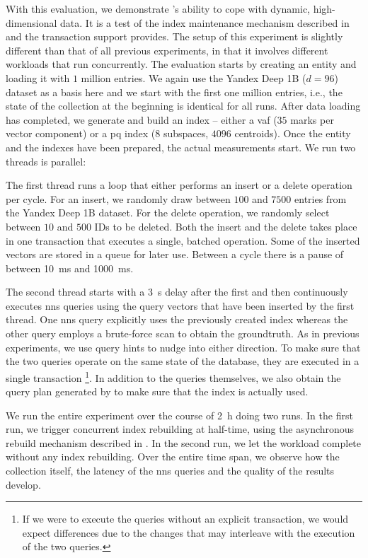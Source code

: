 With this evaluation, we demonstrate \cottontail{}'s ability to cope with dynamic, high-dimensional data. It is a test of the index maintenance mechanism described in  and the transaction support \cottontail{} provides. The setup of this experiment is slightly different than that of all previous experiments, in that it involves different workloads that run concurrently. The evaluation starts by creating an entity and loading it with $1$ million entries. We again use the Yandex Deep 1B ($d = 96$) dataset as a basis here and we start with the first one million entries, i.e., the state of the collection at the beginning is identical for all runs. After data loading has completed, we generate and build an index -- either a \acrshort{vaf} ($35$ marks per vector component) or a \acrshort{pq} index ($8$ subspaces, $4096$ centroids). Once the entity and the indexes have been prepared, the actual measurements start. We run two threads is parallel: 

The first thread runs a loop that either performs an insert or a delete operation per cycle. For an insert, we randomly draw between $100$ and $7500$ entries from the Yandex Deep 1B dataset. For the delete operation, we randomly select between $10$ and $500$ IDs to be deleted. Both the insert and the delete takes place in one transaction that executes a single, batched operation. Some of the inserted vectors are stored in a queue for later use. Between a cycle there is a pause of between \SI{10}{\milli\second} and \SI{1000}{\milli\second}.

The second thread starts with a \SI{3}{\second} delay after the first and then continuously executes \acrshort{nns} queries using the query vectors that have been inserted by the first thread. One \acrshort{nns} query explicitly uses the previously created index whereas the other query employs a brute-force scan to obtain the groundtruth. As in previous experiments, we use query hints to nudge \cottontail{} into either direction. To make sure that the two queries operate on the same state of the database, they are executed in a single transaction \footnote{If we were to execute the queries without an explicit transaction, we would expect differences due to the changes that may interleave with the execution of the two queries.}. In addition to the queries themselves, we also obtain the query plan generated by \cottontail{} to make sure that the index is actually used. 

We run the entire experiment over the course of \SI{2}{\hour} doing two runs. In the first run, we trigger concurrent index rebuilding at half-time, using the asynchronous rebuild mechanism described in . In the second run, we let the workload complete without any index rebuilding. Over the entire time span, we observe how the collection itself, the latency of the \acrshort{nns} queries and the quality of the results develop.

